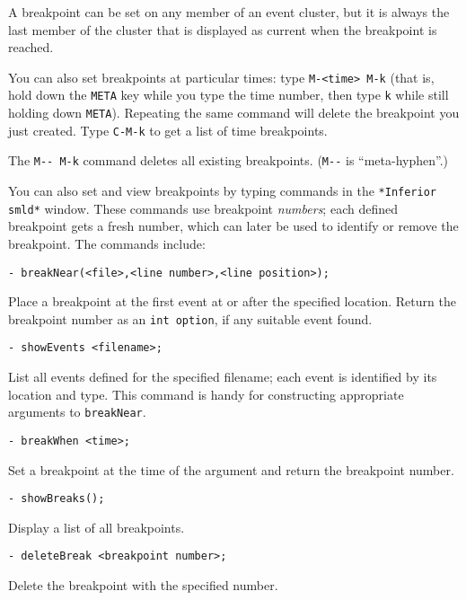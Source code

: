 A breakpoint can be set on any member of an event cluster, but it is always
the last member of the cluster that is displayed as 
current when the breakpoint is reached.

You can also set breakpoints at particular times: type
\verb'M-<time> M-k'
(that is, hold down the \verb'META' key while you type
the time number, then type \verb'k' while still holding down \verb'META').
Repeating the same command will delete the breakpoint
you just created.  Type \verb'C-M-k' to get a list of time breakpoints.

The \verb'M-- M-k' command deletes all existing breakpoints.
(\verb'M--' is ``meta-hyphen''.)  

You can also set and view breakpoints by typing commands in the 
\verb'*Inferior smld*' window. 
These commands use breakpoint {\em numbers}; each defined breakpoint gets
a fresh number, which can later be used to identify or remove the breakpoint.
The commands include:

\begin{verbatim}
- breakNear(<file>,<line number>,<line position>);
\end{verbatim}

Place a breakpoint at the first event at or after the specified location.
Return the breakpoint number as an {\tt int option}, 
if any suitable event found.

\begin{verbatim}
- showEvents <filename>;
\end{verbatim}

List all events defined for the specified filename; each
event is identified by its location and type.  This command is handy
for constructing appropriate arguments to \verb'breakNear'.

\begin{verbatim}
- breakWhen <time>;
\end{verbatim}

Set a breakpoint at the time of the argument and return the breakpoint
number.

\begin{verbatim}
- showBreaks();
\end{verbatim}

Display a list of all breakpoints.

\begin{verbatim}
- deleteBreak <breakpoint number>;
\end{verbatim}

Delete the breakpoint with the specified number.

